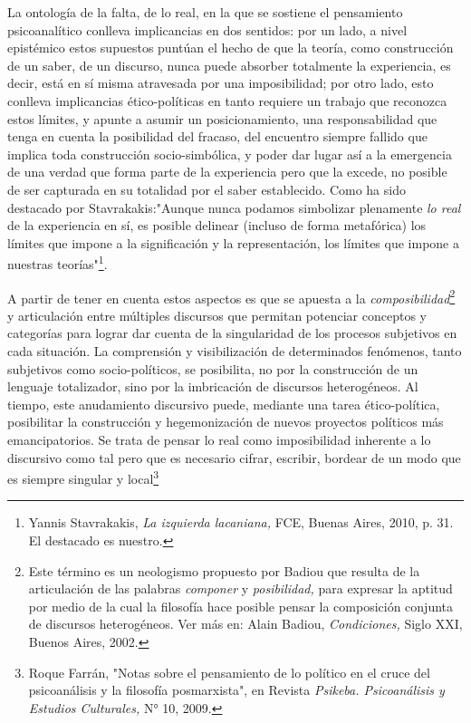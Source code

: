 La ontología de la falta, de lo real, en la que se sostiene el
pensamiento psicoanalítico conlleva implicancias en dos sentidos: por un
lado, a nivel epistémico estos supuestos puntúan el hecho de que la
teoría, como construcción de un saber, de un discurso, nunca puede
absorber totalmente la experiencia, es decir, está en sí misma
atravesada por una imposibilidad; por otro lado, esto conlleva
implicancias ético-políticas en tanto requiere un trabajo que reconozca
estos límites, y apunte a asumir un posicionamiento, una responsabilidad
que tenga en cuenta la posibilidad del fracaso, del encuentro siempre
fallido que implica toda construcción socio-simbólica, y poder dar lugar
así a la emergencia de una verdad que forma parte de la experiencia pero
que la excede, no posible de ser capturada en su totalidad por el saber
establecido. Como ha sido destacado por Stavrakakis:"Aunque nunca
podamos simbolizar plenamente \emph{lo real} de la experiencia en sí, es
posible delinear (incluso de forma metafórica) los límites que impone a
la significación y la representación, los límites que impone a nuestras
teorías"\footnote{Yannis Stavrakakis, \emph{La izquierda lacaniana,}
  FCE, Buenas Aires, 2010, p. 31. El destacado es nuestro.}.

A partir de tener en cuenta estos aspectos es que se apuesta a la
\emph{composibilidad}\footnote{Este término es un neologismo propuesto
  por Badiou que resulta de la articulación de las palabras
  \emph{componer} y \emph{posibilidad,} para expresar la aptitud por
  medio de la cual la filosofía hace posible pensar la composición
  conjunta de discursos heterogéneos. Ver más en: Alain Badiou,
  \emph{Condiciones,} Siglo XXI, Buenos Aires, 2002.} y articulación
entre múltiples discursos que permitan potenciar conceptos y categorías
para lograr dar cuenta de la singularidad de los procesos subjetivos en
cada situación. La comprensión y visibilización de determinados
fenómenos, tanto subjetivos como socio-políticos, se posibilita, no por
la construcción de un lenguaje totalizador, sino por la imbricación de
discursos heterogéneos. Al tiempo, este anudamiento discursivo puede,
mediante una tarea ético-política, posibilitar la construcción y
hegemonización de nuevos proyectos políticos más emancipatorios. Se
trata de pensar lo real como imposibilidad inherente a lo discursivo
como tal pero que es necesario cifrar, escribir, bordear de un modo que
es siempre singular y local\footnote{Roque Farrán, "Notas sobre el
  pensamiento de lo político en el cruce del psicoanálisis y la
  filosofía posmarxista", en Revista \emph{Psikeba. Psicoanálisis y
  Estudios Culturales,} N° 10, 2009.}

